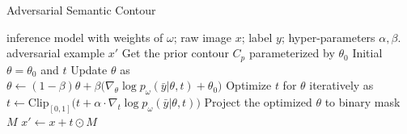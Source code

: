\documentclass[times,twocolumn,final,authoryear]{elsarticle}
\begin{document}
\begin{algorithm}[t]
\caption{Adversarial Semantic Contour} 
\label{alg1}
\begin{algorithmic}[1]
\REQUIRE inference model with weights of $\omega$; raw image $x$; label $y$; hyper-parameters $\alpha,\beta$.
\ENSURE adversarial example $x'$
\STATE Get the prior contour $C_p$ parameterized by $\theta_0$ 
\STATE Initial $\theta = \theta_0$ and $t$
\STATE Update $\theta$ as\\$\theta \leftarrow (1-\beta)\theta + \beta\big(\nabla_{\theta}\log p_\omega(\bar{y}|\theta,t)+\theta_0\big)$
\STATE Optimize $t$ for $\theta$ iteratively as \\$t \leftarrow \textrm{Clip}_{[0,1]}\big(t + \alpha\cdot\nabla_{t} \log p_\omega(\bar{y}|\theta,t)\big)$
\ENDWHILE
\STATE Project the optimized $\theta$ to binary mask $M$
\RETURN $x' \xleftarrow[]{} x+t\odot M$
\end{algorithmic}
\end{algorithm} 




\end{document}
